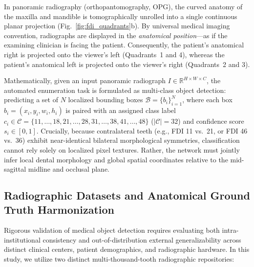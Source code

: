 \documentclass[10pt,journal,compsoc]{IEEEtran}
\begin{document}
In panoramic radiography (orthopantomography, OPG), the curved anatomy of the maxilla and mandible is tomographically unrolled into a single continuous planar projection (Fig.~\ref{fig:fdi_quadrants}b). By universal medical imaging convention, radiographs are displayed in the \textit{anatomical position}---as if the examining clinician is facing the patient. Consequently, the patient's anatomical right is projected onto the viewer's left (Quadrants~1 and 4), whereas the patient's anatomical left is projected onto the viewer's right (Quadrants~2 and 3). 

Mathematically, given an input panoramic radiograph $I \in \mathbb{R}^{H \times W \times C}$, the automated enumeration task is formulated as multi-class object detection: predicting a set of $N$ localized bounding boxes $\mathcal{B} = \{b_i\}_{i=1}^N$, where each box $b_i = (x_i, y_i, w_i, h_i)$ is paired with an assigned class label $c_i \in \mathcal{C} = \{11, \dots, 18, 21, \dots, 28, 31, \dots, 38, 41, \dots, 48\}$ ($|\mathcal{C}| = 32$) and confidence score $s_i \in [0, 1]$. Crucially, because contralateral teeth (e.g., FDI 11 vs.\ 21, or FDI 46 vs.\ 36) exhibit near-identical bilateral morphological symmetries, classification cannot rely solely on localized pixel textures. Rather, the network must jointly infer local dental morphology and global spatial coordinates relative to the mid-sagittal midline and occlusal plane.

\subsection{Radiographic Datasets and Anatomical Ground Truth Harmonization}
Rigorous validation of medical object detection requires evaluating both intra-institutional consistency and out-of-distribution external generalizability across distinct clinical centers, patient demographics, and radiographic hardware. In this study, we utilize two distinct multi-thousand-tooth radiographic repositories:
\end{document}
